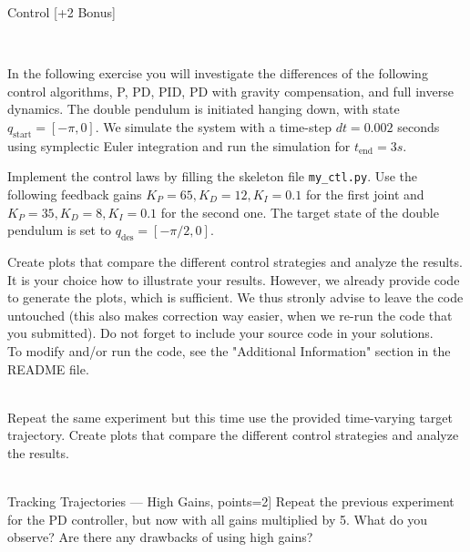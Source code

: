 \documentclass[
	ngerman,
	points=true,%
	]{tudaexercise}
\begin{document}
\begin{task}[points=30]{Control [+2 Bonus]}
\begin{subtask}[title=Gravity Compensation and Inverse Dynamics Control, points=5]{}
        \todo \\

    \end{subtask}  
    
    \begin{subtask}[title=Comparison of Different Control Strategies, points=15]{}
		In the following exercise you will investigate the differences of the following control algorithms, P, PD, PID, PD with gravity compensation, and full inverse dynamics.
		The double pendulum is initiated hanging down, with state $q_\textrm{start}={[-\pi,0]}$. We simulate the system with a time-step $dt=0.002$ seconds using symplectic Euler integration and run the simulation for $t_\textrm{end}=3s$. 

		Implement the control laws by filling the skeleton file \texttt{my\_ctl.py}. Use the following feedback gains $K_P=65, K_D=12, K_I=0.1$ for the first joint and $K_P=35, K_D=8, K_I=0.1$ for the second one.
		The target state of the double pendulum is set to $q_\textrm{des}={[-\pi / 2,0]}$.

		Create plots that compare the different control strategies and analyze the results. It is your choice how to illustrate your results. However, we already provide code to generate the plots, which is sufficient. We thus stronly advise to leave the code untouched (this also makes correction way easier, when we re-run the code that you submitted). Do not forget to include your source code in your solutions. \\
		To modify and/or run the code, see the "Additional Information" section in the README file. \\

        \todo \\

    \end{subtask}  
    
    \begin{subtask}[title=Tracking Trajectories, points=5]{}
        Repeat the same experiment but this time use the provided time-varying target trajectory. Create plots that compare the different control strategies and analyze the results. \\
        
        \todo \\

    \end{subtask}    
    
    \begin{subtask}[title= [Bonus] Tracking Trajectories — High Gains, points=2]{}
        Repeat the previous experiment for the PD controller, but now with all gains multiplied by 5. What do you observe? Are there any drawbacks of using high gains? \\
        

\end{subtask}
\end{task}
\end{document}
